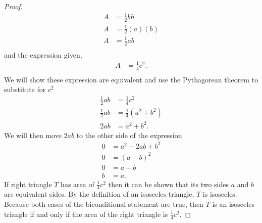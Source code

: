 \documentclass{article}
\begin{document}
\begin{proof}
     \begin{align*}
         A &= \frac{1}{2}bh\\
         A &= \frac{1}{2}(a)(b)\\
         A &= \frac{1}{2}ab\\
    \end{align*}
    and the expression given,
    \begin{align*}
        A &= \frac{1}{4}c^2.\\ 
    \end{align*}
    We will show these expression are equivalent and use the Pythagorean theorem to substitute for $c^2$
    \begin{align*}
        \frac{1}{2}ab & = \frac{1}{4}c^2\\
        \frac{1}{2}ab & = \frac{1}{4}(a^2+b^2)\\
        2ab &= a^2+b^2.
    \end{align*}
    We will then move $2ab$ to the other side of the expression
    \begin{align*}
        0 &= a^2 - 2ab + b^2\\
        0 &= (a-b)^2\\
        0 &= a-b\\
        b &= a.
    \end{align*}
    If right triangle $T$ has area of $\frac{1}{4}c^2$ then it can be shown that its two sides $a$ and $b$ are equivalent sides. By the definition of an isosceles triangle, $T$ is isosceles. Because both cases of the biconditional statement are true, then $T$ is an isosceles triangle if and only if the area of the right triangle is $\frac{1}{4}c^2$.
    \end{proof}
\end{document}
